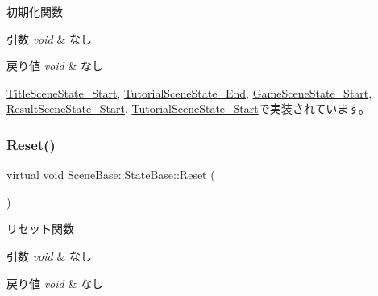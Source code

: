 初期化関数 


\begin{DoxyParams}{引数}
{\em void} & なし \\
\hline
\end{DoxyParams}

\begin{DoxyRetVals}{戻り値}
{\em void} & なし \\
\hline
\end{DoxyRetVals}


\mbox{\hyperlink{class_title_scene_state___start_a3e785ba088ac3fd0989fd657e5d0cd34}{Title\+Scene\+State\+\_\+\+Start}}, \mbox{\hyperlink{class_tutorial_scene_state___end_a572e5687140ff5ac43789f90462c05a5}{Tutorial\+Scene\+State\+\_\+\+End}}, \mbox{\hyperlink{class_game_scene_state___start_ae921c57f349fbb2f00a197d40a3404b7}{Game\+Scene\+State\+\_\+\+Start}}, \mbox{\hyperlink{class_result_scene_state___start_a615c7e05efd2320b8956c5fd94398f55}{Result\+Scene\+State\+\_\+\+Start}}, \mbox{\hyperlink{class_tutorial_scene_state___start_acd4cd7e4efeebffa9616d7ca31c7b1c0}{Tutorial\+Scene\+State\+\_\+\+Start}}で実装されています。

\mbox{\label{class_scene_base_1_1_state_base_a2e14a3afece0b1d8db9edcebf514a977}} 
\subsubsection{\texorpdfstring{Reset()}{Reset()}}
{\footnotesize\ttfamily virtual void Scene\+Base\+::\+State\+Base\+::\+Reset (\begin{DoxyParamCaption}{ }\end{DoxyParamCaption})\hspace{0.3cm}{\ttfamily [pure virtual]}}



リセット関数 


\begin{DoxyParams}{引数}
{\em void} & なし \\
\hline
\end{DoxyParams}

\begin{DoxyRetVals}{戻り値}
{\em void} & なし \\
\hline
\end{DoxyRetVals}


